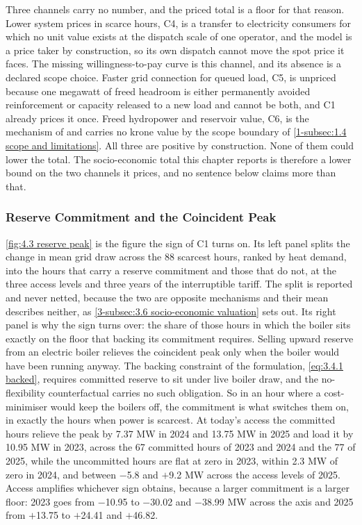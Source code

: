 Three channels carry no number, and the priced total is a floor for that reason. Lower system prices in scarce hours, C4, is a transfer to electricity consumers for which no unit value exists at the dispatch scale of one operator, and the model is a price taker by construction, so its own dispatch cannot move the spot price it faces. The missing willingness-to-pay curve is this channel, and its absence is a declared scope choice. Faster grid connection for queued load, C5, is unpriced because one megawatt of freed headroom is either permanently avoided reinforcement or capacity released to a new load and cannot be both, and C1 already prices it once. Freed hydropower and reservoir value, C6, is the mechanism of \cite{askeland_balancing_2019} and carries no krone value by the scope boundary of \autoref{1-subsec:1.4 scope and limitations}. All three are positive by construction. None of them could lower the total. The socio-economic total this chapter reports is therefore a lower bound on the two channels it prices, and no sentence below claims more than that.

\subsubsection{Reserve Commitment and the Coincident Peak}
\label{4-subsec:4.2.2 reserve and relief}

\autoref{fig:4.3 reserve peak} is the figure the sign of C1 turns on. Its left panel splits the change in mean grid draw across the 88 scarcest hours, ranked by heat demand, into the hours that carry a reserve commitment and those that do not, at the three access levels and three years of the interruptible tariff. The split is reported and never netted, because the two are opposite mechanisms and their mean describes neither, as \autoref{3-subsec:3.6 socio-economic valuation} sets out. Its right panel is why the sign turns over: the share of those hours in which the boiler sits exactly on the floor that backing its commitment requires. Selling upward reserve from an electric boiler relieves the coincident peak only when the boiler would have been running anyway. The backing constraint of the formulation, \autoref{eq:3.4.1 backed}, requires committed reserve to sit under live boiler draw, and the no-flexibility counterfactual carries no such obligation. So in an hour where a cost-minimiser would keep the boilers off, the commitment is what switches them on, in exactly the hours when power is scarcest. At today's access the committed hours relieve the peak by 7.37 MW in 2024 and 13.75 MW in 2025 and load it by 10.95 MW in 2023, across the 67 committed hours of 2023 and 2024 and the 77 of 2025, while the uncommitted hours are flat at zero in 2023, within 2.3 MW of zero in 2024, and between $-$5.8 and $+$9.2 MW across the access levels of 2025. Access amplifies whichever sign obtains, because a larger commitment is a larger floor: 2023 goes from $-$10.95 to $-$30.02 and $-$38.99 MW across the axis and 2025 from $+$13.75 to $+$24.41 and $+$46.82.


